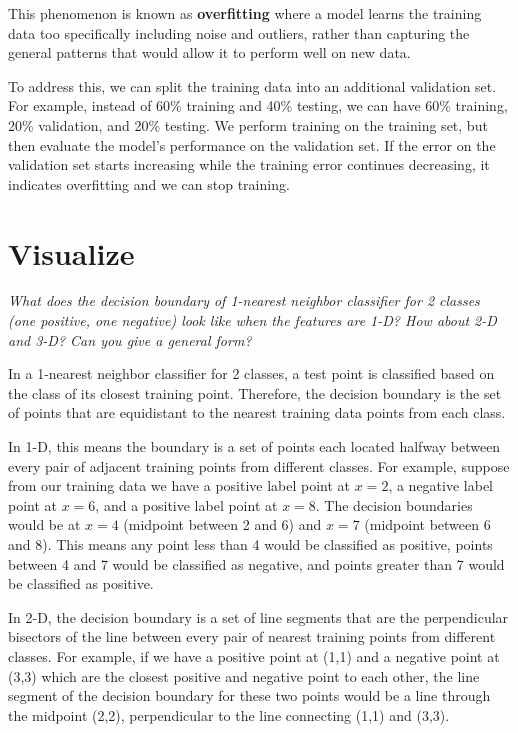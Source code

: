 \documentclass[fleqn]{article}
\begin{document}
This phenomenon is known as \textbf{overfitting} where a model learns the training data too specifically including noise and outliers,
rather than capturing the general patterns that would allow it to perform well on new data.

To address this, we can split the training data into an additional validation set.
For example, instead of 60\% training and 40\% testing, we can have 60\% training, 20\% validation, and 20\% testing.
We perform training on the training set, but then evaluate the model's performance on the validation set.
If the error on the validation set starts increasing while the training error continues decreasing, it indicates overfitting and we can stop training.

\section{Visualize}
\textit{What does the decision boundary of 1-nearest neighbor classifier for 2 classes (one positive, one negative) look like when the features are 1-D? How about 2-D and 3-D? Can you give a general form?}

In a 1-nearest neighbor classifier for 2 classes, a test point is classified based on the class of its closest training point.
Therefore, the decision boundary is the set of points that are equidistant to the nearest training data points from each class.

In 1-D, this means the boundary is a set of points each located halfway between every pair of adjacent training points from different classes.
For example, suppose from our training data we have a positive label point at $x=2$, a negative label point at $x=6$, and a positive label point at $x=8$.
The decision boundaries would be at $x=4$ (midpoint between 2 and 6) and $x=7$ (midpoint between 6 and 8).
This means any point less than 4 would be classified as positive, points between 4 and 7 would be classified as negative, and points greater than 7 would be classified as positive.

In 2-D, the decision boundary is a set of line segments that are the perpendicular bisectors of the line between every pair of nearest training points from different classes.
For example, if we have a positive point at (1,1) and a negative point at (3,3) which are the closest positive and negative point to each other,
the line segment of the decision boundary for these two points would be a line through the midpoint (2,2), perpendicular to the line connecting (1,1) and (3,3).
\end{document}
